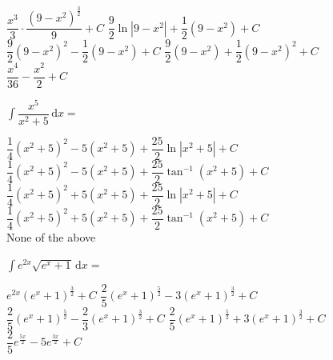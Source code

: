 \begin{questions}
    \begin{oneparchoices}
        \choice $\dfrac{x^3}{3} \cdot \dfrac{\left(9 - x^2\right)^{\frac{3}{2}}}{9} + C$
        \choice $\dfrac{9}{2}\ln |9 - x^2| + \dfrac{1}{2}\left(9 - x^2\right) + C$ \\[11pt]
        \makebox[0.035\textwidth] \choice $\dfrac{9}{2}\left(9 - x^2\right)^2 - \dfrac{1}{2}\left(9 - x^2\right) + C$
        \choice $\dfrac{9}{2}\left(9 - x^2\right) + \dfrac{1}{2}\left(9 - x^2\right)^2 + C$ \\[11pt]
        \makebox[0.035\textwidth] \choice $\dfrac{x^4}{36} - \dfrac{x^2}{2} + C$
    \end{oneparchoices} \par \horizontalline

    \question $\int \dfrac{x^5}{x^2 + 5} \,\mathrm{d}x = $ \\

    \begin{oneparchoices}
        \choice $\dfrac{1}{4}\left(x^2 + 5\right)^2 - 5\left(x^2 + 5\right) + \dfrac{25}{2}\ln |x^2 + 5| + C$ \\[11pt]
        \makebox[0.035\textwidth] \choice $\dfrac{1}{4}\left(x^2 + 5\right)^2 - 5\left(x^2 + 5\right) + \dfrac{25}{2}\tan^{-1} \left(x^2 + 5\right) + C$ \\[11pt]
        \makebox[0.035\textwidth] \choice $\dfrac{1}{4}\left(x^2 + 5\right)^2 + 5\left(x^2 + 5\right) + \dfrac{25}{2}\ln |x^2 + 5| + C$ \\[11pt]
        \makebox[0.035\textwidth] \choice $\dfrac{1}{4}\left(x^2 + 5\right)^2 + 5\left(x^2 + 5\right) + \dfrac{25}{2}\tan^{-1} \left(x^2 + 5\right) + C$ \\[11pt]
        \makebox[0.035\textwidth] \choice None of the above
    \end{oneparchoices} \par \horizontalline

    \question $\int e^{2x}\sqrt{e^x + 1} \,\mathrm{d}x = $ \\

    \begin{oneparchoices}
        \choice $e^{2x}\left(e^x + 1\right)^{\frac{3}{2}} + C$
        \choice $\dfrac{2}{5}\left(e^x + 1\right)^{\frac{5}{2}} - 3\left(e^x + 1\right)^{\frac{3}{2}} + C$ \\[11pt]
        \makebox[0.035\textwidth] \choice $\dfrac{2}{5}\left(e^x + 1\right)^{\frac{5}{2}} - \dfrac{2}{3}\left(e^x + 1\right)^{\frac{3}{2}} + C$ 
        \choice $\dfrac{2}{5}\left(e^x + 1\right)^{\frac{5}{2}} + 3\left(e^x + 1\right)^{\frac{3}{2}} + C$ \\[11pt]
        \makebox[0.035\textwidth] \choice $\dfrac{2}{5}e^{\frac{5x}{2}} - 5e^{\frac{3x}{2}} + C$
    \end{oneparchoices} \par \horizontalline


\end{questions}
